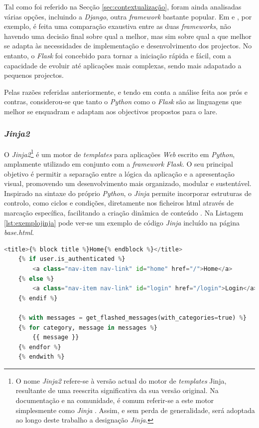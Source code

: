 Tal como foi referido na Secção \ref{sec:contextualização}, foram ainda analisadas várias opções, incluindo a \textit{Django}, outra \textit{framework} bastante popular. Em \cite{Djangovsflask} e \cite{FlaskvsDjango}, por exemplo, é feita uma comparação exaustiva entre as duas \textit{frameworks}, não havendo uma decisão final sobre qual a melhor, mas sim sobre qual a que melhor se adapta às necessidades de implementação e desenvolvimento dos projectos. No entanto, o \textit{Flask} foi concebido para tornar a iniciação rápida e fácil, com a capacidade de evoluir até aplicações mais complexas, sendo mais adapatado a pequenos projectos.

Pelas razões referidas anteriormente, e tendo em conta a análise feita aos prós e contras, considerou-se que tanto o \textit{Python} como o \textit{Flask} são as linguagens que melhor se enquadram e adaptam aos objectivos propostos para o \acrshort{lare}.

\subsubsection{\textit{Jinja2}}
\label{sec:jinja2}
O \textit{Jinja2}\footnote{O nome \textit{Jinja2} refere-se à versão actual do motor de \textit{templates} Jinja, resultante de uma reescrita significativa da sua versão original. Na documentação e na comunidade, é comum referir-se a este motor simplesmente como \textit{Jinja} \cite{Jinja}. Assim, e sem perda de generalidade, será adoptada ao longo deste trabalho a designação \textit{Jinja}.} é um motor de \textit{templates} para aplicações \textit{Web} escrito em \textit{Python}, amplamente utilizado em conjunto com a \textit{framework} \textit{Flask}. O seu principal objetivo é permitir a separação entre a lógica da aplicação e a apresentação visual, promovendo um desenvolvimento mais organizado, modular e sustentável. Inspirado na sintaxe do próprio \textit{Python}, o \textit{Jinja} permite incorporar estruturas de controlo, como ciclos e condições, diretamente nos ficheiros \acrshort{html} através de marcação específica, facilitando a criação dinâmica de conteúdo \cite{Jinja}. Na Listagem \ref{lst:exemplojinja} pode ver-se um exemplo de código \textit{Jinja} incluído na página \textit{base.html}.

\begin{minipage}{0.9\linewidth}
    \begin{lstlisting}[language=python, caption=Exemplo \textit{Jinja} incluído na página \textit{base.html}, label=lst:exemplojinja]
	<title>{% block title %}Home{% endblock %}</title>
    {% if user.is_authenticated %}
        <a class="nav-item nav-link" id="home" href="/">Home</a>
    {% else %}
        <a class="nav-item nav-link" id="login" href="/login">Login</a>
    {% endif %}

    {% with messages = get_flashed_messages(with_categories=true) %}
    {% for category, message in messages %}
        {{ message }}
    {% endfor %}
    {% endwith %}

	\end{lstlisting}
\end{minipage}

